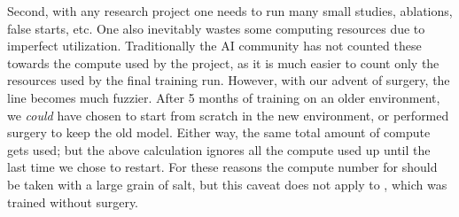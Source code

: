 \documentclass[ocean-paper.tex]{subfiles}
\begin{document}
Second, with any research project one needs to run many small studies, ablations, false starts, etc. 
One also inevitably wastes some computing resources due to imperfect utilization.
Traditionally the AI community has not counted these towards the compute used by the project, as it is much easier to count only the resources used by the final training run. 
However, with our advent of surgery, the line becomes much fuzzier.
After 5 months of training on an older environment, we \emph{could} have chosen to start from scratch in the new environment, or performed surgery to keep the old model.
Either way, the same total amount of compute gets used; but the above calculation ignores all the compute used up until the last time we chose to restart.
For these reasons the compute number for \openaifive should be taken with a large grain of salt, but this caveat does not apply to \cleanexpname, which was trained without surgery.
\end{document}
